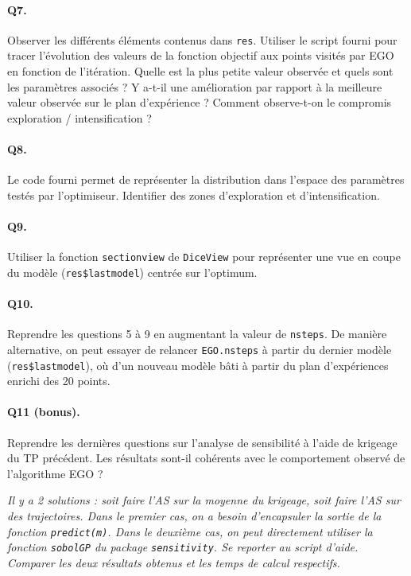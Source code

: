 \documentclass[12pt]{scrartcl}
\begin{document}
\paragraph{Q7. } Observer les différents éléments contenus dans \texttt{res}. Utiliser le script fourni pour tracer l'évolution des valeurs de la fonction objectif aux points visités par EGO en fonction de l'itération. 
Quelle est la plus petite valeur observée et quels sont les paramètres associés ? Y a-t-il une amélioration par rapport à la meilleure valeur observée sur le plan d'expérience ?
Comment observe-t-on le compromis exploration / intensification ?

\paragraph{Q8. } Le code fourni permet de représenter la distribution dans l'espace des paramètres testés par l'optimiseur. Identifier des zones d'exploration et d'intensification.

\paragraph{Q9. } Utiliser la fonction \texttt{sectionview} de \texttt{DiceView} pour représenter une vue en coupe du modèle (\texttt{res\$lastmodel}) centrée sur l'optimum.

\paragraph{Q10. } Reprendre les questions 5 à 9 en augmentant la valeur de \texttt{nsteps}. De manière alternative, on peut essayer de relancer \texttt{EGO.nsteps} à partir du dernier modèle (\texttt{res\$lastmodel}), 
où d'un nouveau modèle bâti à partir du plan d'expériences enrichi des 20 points.

\paragraph{Q11 (bonus). } Reprendre les dernières questions sur l'analyse de sensibilité à l'aide de krigeage du TP précédent. Les résultats sont-il cohérents avec le comportement observé de l'algorithme EGO ?

\textit{Il y a 2 solutions : soit faire l'AS sur la moyenne du krigeage, soit faire l'AS sur des trajectoires.
Dans le premier cas, on a besoin d'encapsuler la sortie de la fonction \texttt{predict(m)}. Dans le deuxième cas, on peut directement utiliser la fonction \texttt{sobolGP} du package \texttt{sensitivity}.
Se reporter au script d'aide. Comparer les deux résultats obtenus et les temps de calcul respectifs.} 

\end{document}
